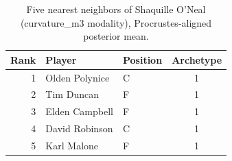 \begin{table}[htbp]
  \centering\small
  \begin{tabular}{rllc}
    \toprule
    Rank & Player & Position & Archetype \\
    \midrule
    1 & Olden Polynice & C & 1 \\
    2 & Tim Duncan & F & 1 \\
    3 & Elden Campbell & F & 1 \\
    4 & David Robinson & C & 1 \\
    5 & Karl Malone & F & 1 \\
    \bottomrule
  \end{tabular}
  \caption{Five nearest neighbors of Shaquille O'Neal (curvature_m3 modality), Procrustes-aligned posterior mean.}
  \label{tab:Shaquille_O_Neal_neighbors_curvature_m3}
\end{table}

